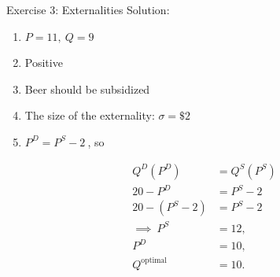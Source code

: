 \documentclass[9pt, handout]{beamer}
\begin{document}
\begin{frame}{Exercise 3: Externalities}
    Solution:
    \begin{enumerate}
        \item $P=11, \: Q = 9$
        \item Positive
        \item Beer should be subsidized
        \item The size of the externality: $\sigma = \$2$
        \item $P^D = P^S - 2 \:$, so 
    \end{enumerate}
    \begin{align*}
        Q^D(P^D) &= Q^S(P^S)\\
        20 - P^D &= P^S - 2\\
        20 - (P^S - 2) &= P^S - 2\\
        \implies \: P^S &= 12,\\
        P^D &= 10,\\
        Q^{\textrm{optimal}} &= 10.
    \end{align*}
\end{frame}
\end{document}
